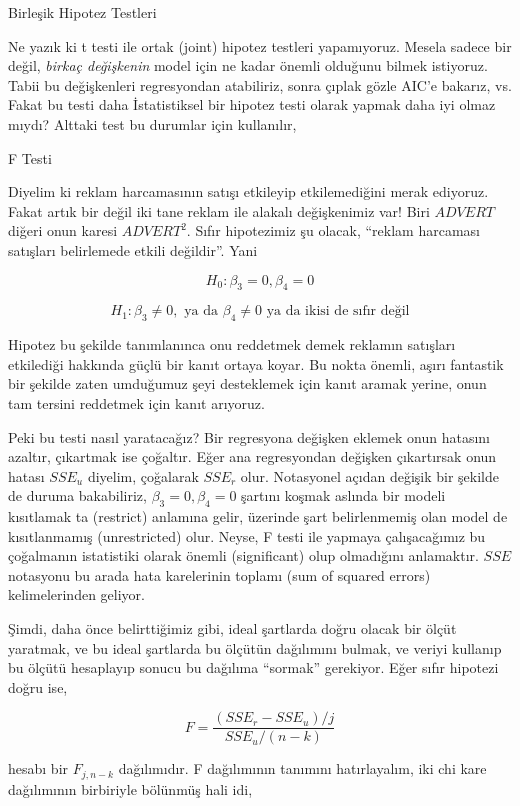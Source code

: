 \documentclass[12pt,fleqn]{article}\usepackage{../../common}
\begin{document}
Birleşik Hipotez Testleri

Ne yazık ki t testi ile ortak (joint) hipotez testleri
yapamıyoruz. Mesela sadece bir değil, {\em birkaç değişkenin} model için ne
kadar önemli olduğunu bilmek istiyoruz. Tabii bu değişkenleri regresyondan
atabiliriz, sonra çıplak gözle AIC'e bakarız, vs. Fakat bu testi daha
İstatistiksel bir hipotez testi olarak yapmak daha iyi olmaz mıydı? Alttaki
test bu durumlar için kullanılır,

F Testi

Diyelim ki reklam harcamasının satışı etkileyip etkilemediğini merak
ediyoruz. Fakat artık bir değil iki tane reklam ile alakalı değişkenimiz
var! Biri $ADVERT$ diğeri onun karesi $ADVERT^2$. Sıfır hipotezimiz şu
olacak, ``reklam harcaması satışları belirlemede etkili değildir''. Yani 

$$ H_0: \beta_3=0, \beta_4=0 $$

$$ H_1: \beta_3 \ne 0, \textrm{ ya da } \beta_4 \ne 0 \textrm{ ya da ikisi
  de sıfır değil} $$

Hipotez bu şekilde tanımlanınca onu reddetmek demek reklamın satışları
etkilediği hakkında güçlü bir kanıt ortaya koyar. Bu nokta önemli, aşırı
fantastik bir şekilde zaten umduğumuz şeyi desteklemek için kanıt aramak
yerine, onun tam tersini reddetmek için kanıt arıyoruz. 

Peki bu testi nasıl yaratacağız? Bir regresyona değişken eklemek onun
hatasını azaltır, çıkartmak ise çoğaltır. Eğer ana regresyondan değişken
çıkartırsak onun hatası $SSE_u$ diyelim, çoğalarak $SSE_r$ olur. Notasyonel
açıdan değişik bir şekilde de duruma bakabiliriz, $\beta_3=0, \beta_4=0$
şartını koşmak aslında bir modeli kısıtlamak ta (restrict) anlamına gelir,
üzerinde şart belirlenmemiş olan model de kısıtlanmamış (unrestricted)
olur. Neyse, F testi ile yapmaya çalışacağımız bu çoğalmanın istatistiki
olarak önemli (significant) olup olmadığını anlamaktır. $SSE$ notasyonu bu
arada hata karelerinin toplamı (sum of squared errors) kelimelerinden
geliyor.

Şimdi, daha önce belirttiğimiz gibi, ideal şartlarda doğru olacak bir ölçüt
yaratmak, ve bu ideal şartlarda bu ölçütün dağılımını bulmak, ve veriyi
kullanıp bu ölçütü hesaplayıp sonucu bu dağılıma ``sormak''
gerekiyor. Eğer sıfır hipotezi doğru ise,

$$ F = \frac{(SSE_r - SSE_u)/j}{SSE_u/(n-k)} $$

hesabı bir $F_{j,n-k}$ dağılımıdır. F dağılımının tanımını hatırlayalım,
iki chi kare dağılımının birbiriyle bölünmüş hali idi,
\end{document}
